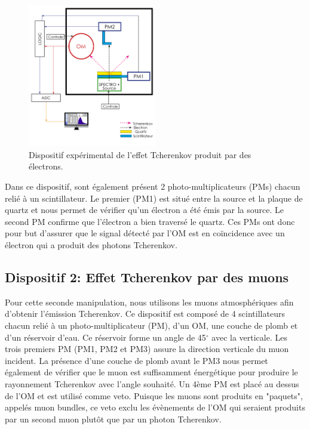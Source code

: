 \begin{figure}[!h]
    \centering
    \includegraphics[width=0.5\textwidth]{figures/Dispositif_1.png}
    \caption{Dispositif expérimental de l'effet Tcherenkov produit par des électrons.}
    \label{fig:dispo1} 
\end{figure}

Dans ce dispositif, sont également présent 2 photo-multiplicateurs (PMs) chacun relié à un scintillateur. Le premier (PM1) est situé entre la source et la plaque de quartz et nous permet de vérifier qu'un électron a été émis par la source. Le second PM confirme que l'électron a bien traversé le quartz. Ces PMs ont donc pour but d'assurer que le signal détecté par l'OM est en coïncidence avec un électron qui a produit des photons Tcherenkov.

\subsection{Dispositif 2: Effet Tcherenkov par des muons}

Pour cette seconde manipulation, nous utilisons les muons atmosphériques afin d'obtenir l'émission Tcherenkov. Ce dispositif est composé de 4 scintillateurs chacun relié à un photo-multiplicateur (PM), d'un OM, une couche de plomb et d'un réservoir d'eau. Ce réservoir forme un angle de 45$^{\circ}$ avec la verticale. Les trois premiers PM (PM1, PM2 et PM3) assure la direction verticale du muon incident. La présence d'une couche de plomb avant le PM3 nous permet également de vérifier que le muon est suffisamment énergétique pour produire le rayonnement Tcherenkov avec l'angle souhaité. Un 4ème PM est placé au dessus de l'OM et est utilisé comme veto. Puisque les muons sont produits en "paquets", appelés muon bundles, ce veto exclu les évènements de l'OM qui seraient produits par un second muon plutôt que par un photon Tcherenkov.

